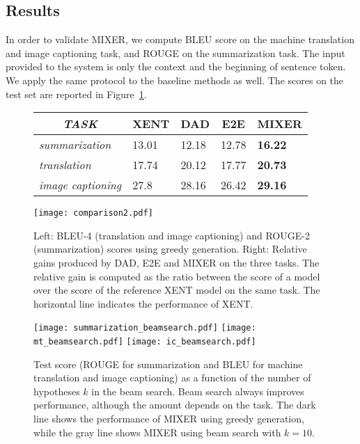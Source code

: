 \documentclass{article} \usepackage{iclr2016_conference,times}
\begin{document}
\subsection{Results}
In order to validate MIXER, we compute BLEU score on the machine translation and image captioning task, and ROUGE on the summarization task. 
The input provided to the system is only the context and the beginning of sentence token. We apply the same protocol to the baseline methods as well. The scores on the test set are reported in Figure~\ref{fig:gain}. \begin{figure}[!t]
\centering
\begin{minipage}[c][][c]{.4\textwidth}
\centering
\begin{tabular}{l || l | l | l |l}
\multicolumn{1}{c||}{\emph{TASK} }  & 
      \multicolumn{1}{c|}{XENT} &
      \multicolumn{1}{c|}{DAD} & \multicolumn{1}{c|}{E2E} & \multicolumn{1}{c}{MIXER}\\
      \hline
      \hline
      {\em summarization} & 13.01 & 12.18 & 12.78 &  \bf{16.22} \\
      \hline
      {\em translation} & 17.74 & 20.12 & 17.77 & {\bf 20.73} \\
      \hline
      {\em image captioning} & 27.8 & 28.16 & 26.42 & \bf{29.16} \\
    \end{tabular}
\end{minipage}\hfill
\begin{minipage}[c][][c]{.4\textwidth}
\centering
\texttt{[image: comparison2.pdf]}
\vspace{-.30cm}
\caption{Left: BLEU-4 (translation and image captioning) and ROUGE-2 (summarization) scores using greedy generation. Right: Relative gains
  produced by DAD, E2E and MIXER on the three tasks. 
  The relative gain is computed as the ratio between the score of a model over the score of the reference XENT model on the same task. The horizontal line indicates the performance of XENT.}
\label{fig:gain}
\end{minipage}
\end{figure}
\begin{figure}[!t]
\begin{center}
\texttt{[image: summarization\_beamsearch.pdf]}
 \hspace{-.6cm}
 \texttt{[image: mt\_beamsearch.pdf]}
 \hspace{-.6cm}
  \texttt{[image: ic\_beamsearch.pdf]}
\end{center}
\vspace{-.2cm}
\caption{Test score (ROUGE for summarization and BLEU for machine translation and image captioning) as a function of the number of hypotheses $k$ in the beam search. Beam search always improves performance, although the amount depends on the task. The dark line shows the performance of MIXER using greedy generation, while the gray line shows MIXER using beam search with $k=10$.}
\label{fig:beam_search}
\end{figure}
\end{document}
